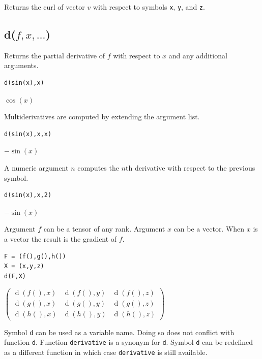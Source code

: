 Returns the curl of vector $v$ with respect to symbols \verb$x$, \verb$y$, and \verb$z$.

\subsection*{d($f,x,\ldots$)}

Returns the partial derivative of $f$ with respect to $x$ and any additional arguments.

{\color{blue}
\begin{verbatim}
d(sin(x),x)
\end{verbatim}
}

$\cos(x)$

\bigskip
Multiderivatives are computed by extending the argument list.

{\color{blue}
\begin{verbatim}
d(sin(x),x,x)
\end{verbatim}
}

$-\sin(x)$

\bigskip
A numeric argument $n$ computes the $n$th derivative with respect to the previous symbol.

{\color{blue}
\begin{verbatim}
d(sin(x),x,2)
\end{verbatim}
}

$-\sin(x)$

\bigskip
Argument $f$ can be a tensor of any rank.
Argument $x$ can be a vector.
When $x$ is a vector the result is the gradient of $f$.

{\color{blue}
\begin{verbatim}
F = (f(),g(),h())
X = (x,y,z)
d(F,X)
\end{verbatim}
}

$\displaystyle
\begin{pmatrix}
\operatorname{d}(f(),x) & \operatorname{d}(f(),y) &  \operatorname{d}(f(),z)
\\[1ex]
\operatorname{d}(g(),x) & \operatorname{d}(g(),y) &  \operatorname{d}(g(),z)
\\[1ex]
\operatorname{d}(h(),x) & \operatorname{d}(h(),y) &  \operatorname{d}(h(),z)
\end{pmatrix}
$

\bigskip
Symbol \verb$d$ can be used as a variable name.
Doing so does not conflict with function \verb$d$.
Function \verb$derivative$ is a synonym for \verb$d$.
Symbol \verb$d$ can be redefined as a different function in which case
\verb$derivative$ is still available.

